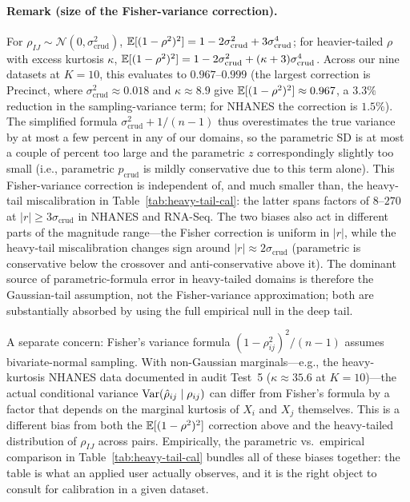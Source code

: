 \paragraph{Remark (size of the Fisher-variance correction).}\label{rem:fisher-correction}
For $\rho_{IJ}\sim\mathcal{N}(0,\sigma_{\mathrm{crud}}^2)$, $\mathbb{E}[(1-\rho^2)^2]=1-2\sigma_{\mathrm{crud}}^2+3\sigma_{\mathrm{crud}}^4$; for heavier-tailed $\rho$ with excess kurtosis $\kappa$, $\mathbb{E}[(1-\rho^2)^2]=1-2\sigma_{\mathrm{crud}}^2+(\kappa+3)\sigma_{\mathrm{crud}}^4$. Across our nine datasets at $K=10$, this evaluates to $0.967$--$0.999$ (the largest correction is Precinct, where $\sigma_{\mathrm{crud}}^2\approx 0.018$ and $\kappa\approx 8.9$ give $\mathbb{E}[(1-\rho^2)^2]\approx 0.967$, a $3.3\%$ reduction in the sampling-variance term; for NHANES the correction is $1.5\%$). The simplified formula $\sigma_{\mathrm{crud}}^2+1/(n-1)$ thus overestimates the true variance by at most a few percent in any of our domains, so the parametric SD is at most a couple of percent too large and the parametric $z$ correspondingly slightly too small (i.e., parametric $p_{\mathrm{crud}}$ is mildly conservative due to this term alone). This Fisher-variance correction is independent of, and much smaller than, the heavy-tail miscalibration in Table~\ref{tab:heavy-tail-cal}: the latter spans factors of $8$--$270$ at $|r|\geq 3\sigma_{\mathrm{crud}}$ in NHANES and RNA-Seq. The two biases also act in different parts of the magnitude range---the Fisher correction is uniform in $|r|$, while the heavy-tail miscalibration changes sign around $|r|\approx 2\sigma_{\mathrm{crud}}$ (parametric is conservative below the crossover and anti-conservative above it). The dominant source of parametric-formula error in heavy-tailed domains is therefore the Gaussian-tail assumption, not the Fisher-variance approximation; both are substantially absorbed by using the full empirical null in the deep tail.

A separate concern: Fisher's variance formula $(1-\rho_{ij}^2)^2/(n-1)$ assumes bivariate-normal sampling. With non-Gaussian marginals---e.g., the heavy-kurtosis NHANES data documented in audit Test~5 ($\kappa\approx 35.6$ at $K=10$)---the actual conditional variance $\operatorname{Var}(\hat\rho_{ij}\mid\rho_{ij})$ can differ from Fisher's formula by a factor that depends on the marginal kurtosis of $X_i$ and $X_j$ themselves. This is a different bias from both the $\mathbb{E}[(1-\rho^2)^2]$ correction above and the heavy-tailed distribution of $\rho_{IJ}$ across pairs. Empirically, the parametric vs.\ empirical comparison in Table~\ref{tab:heavy-tail-cal} bundles all of these biases together: the table is what an applied user actually observes, and it is the right object to consult for calibration in a given dataset.

